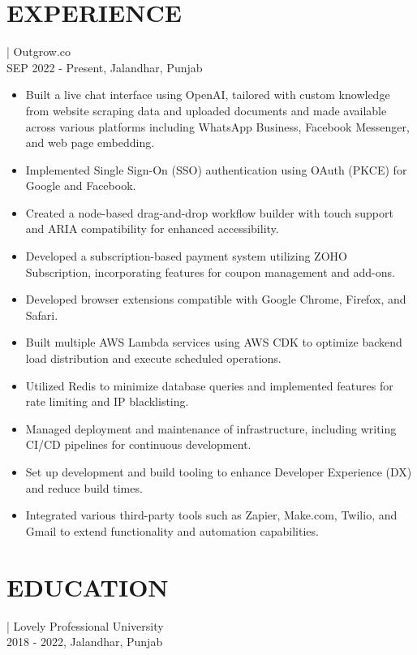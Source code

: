 \documentclass[]{resume}
\begin{document}
\section{EXPERIENCE}
 | \textrm{Outgrow.co}\\
SEP 2022 - Present, Jalandhar, Punjab
\begin{itemize}
  \item Built a live chat interface using OpenAI, tailored with custom knowledge from website scraping data and uploaded documents and made available across various platforms including WhatsApp Business, Facebook Messenger, and web page embedding.
  \item Implemented Single Sign-On (SSO) authentication using OAuth (PKCE) for Google and Facebook.
  \item Created a node-based drag-and-drop workflow builder with touch support and ARIA compatibility for enhanced accessibility.
  \item Developed a subscription-based payment system utilizing ZOHO Subscription, incorporating features for coupon management and add-ons.
  \item Developed browser extensions compatible with Google Chrome, Firefox, and Safari.
  \item Built multiple AWS Lambda services using AWS CDK to optimize backend load distribution and execute scheduled operations.
  \item Utilized Redis to minimize database queries and implemented features for rate limiting and IP blacklisting.
  \item Managed deployment and maintenance of infrastructure, including writing CI/CD pipelines for continuous development.
  \item Set up development and build tooling to enhance Developer Experience (DX) and reduce build times.
  \item Integrated various third-party tools such as Zapier, Make.com, Twilio, and Gmail to extend functionality and automation capabilities.
\end{itemize}

\section{EDUCATION}
 | \textrm{Lovely Professional University}\\
2018 - 2022, Jalandhar, Punjab
\end{document}
